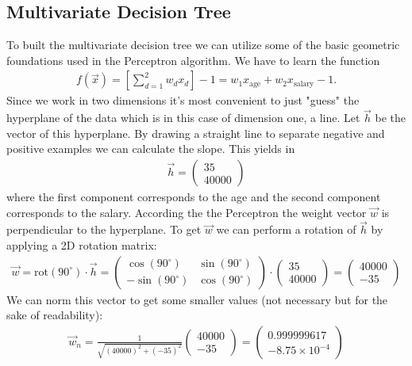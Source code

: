 \documentclass[12pt]{article}
\begin{document}
\subsection{Multivariate Decision Tree}

To built the multivariate decision tree we can utilize some of the basic geometric foundations used in the Perceptron algorithm. We have to learn the function
\begin{align}
f(\vec{x})=\left[\sum_{d=1}^{2}w_dx_d\right]-1=w_1x_\text{age}+w_2x_\text{salary}-1.
\end{align}
Since we work in two dimensions it's most convenient to just "guess" the hyperplane of the data which is in this case of dimension one, a line. Let $\vec{h}$ be the vector of this hyperplane. By drawing a straight line to separate negative and positive examples we can calculate the slope. This yields in 
\begin{align*}
\vec{h} = \begin{pmatrix}35 \\ 40000\end{pmatrix}
\end{align*}
where the first component corresponds to the age and the second component corresponds to the salary. According the the Perceptron the weight vector $\vec{w}$ is perpendicular to the hyperplane. To get $\vec{w}$ we can perform a rotation of $\vec{h}$ by applying a 2D rotation matrix:
\begin{align*}
\vec{w}=\text{rot}(90^{\circ})\cdot \vec{h} = 
	\begin{pmatrix}
		\cos(90^{\circ}) & \sin(90^{\circ}) \\
		-\sin(90^{\circ}) & \cos(90^{\circ}) 
	\end{pmatrix} \cdot
	\begin{pmatrix}
		35 \\ 40000
	\end{pmatrix} =
	\begin{pmatrix}
		40000 \\ -35
	\end{pmatrix}
\end{align*}
We can norm this vector to get some smaller values (not necessary but for the sake of readability):
\begin{align*}
\vec{w}_n = \frac{1}{\sqrt{(40000)^2+(-35)^2}}
\begin{pmatrix}
	40000 \\ -35
\end{pmatrix} =
\begin{pmatrix}
	0.999999617 \\ -8.75\times 10^{-4}
\end{pmatrix}
\end{align*}
\end{document}
